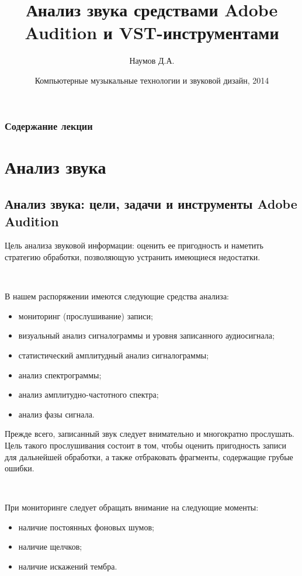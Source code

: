 \documentclass{beamer}
\title[Анализ звука]{Анализ звука средствами Adobe Audition и VST-инструментами}
\author{Наумов Д.А.}
\date[05.03.2014] {Компьютерные музыкальные технологии и звуковой дизайн, 2014}
\begin{document}
\begin{frame}
  \titlepage
\end{frame}
  
\begin{frame}
  \frametitle{Содержание лекции}
  \tableofcontents  
\end{frame}
  
\section{Анализ звука}
\subsection[Анализ звука в Audition]{Анализ звука: цели, задачи и инструменты Adobe Audition}
\begin{frame}
Цель анализа звуковой информации: оценить ее пригодность и наметить стратегию обработки, позволяющую устранить имеющиеся недостатки.

~

В нашем распоряжении имеются следующие средства анализа:
\begin{itemize}
\item мониторинг (прослушивание) записи;
\item визуальный анализ сигналограммы и уровня записанного аудиосигнала;
\item статистический амплитудный анализ сигналограммы;
\item анализ спектрограммы;
\item анализ амплитудно-частотного спектра;
\item анализ фазы сигнала.
\end{itemize}
\end{frame}   

\begin{frame}
Прежде всего, записанный звук следует внимательно и многократно прослушать. Цель такого прослушивания состоит в том, чтобы оценить пригодность записи для дальнейшей обработки, а также отбраковать фрагменты, содержащие грубые ошибки.

~

При мониторинге следует обращать внимание на следующие моменты:
\begin{itemize}
\item наличие постоянных фоновых шумов;
\item наличие щелчков;
\item наличие искажений тембра. 
\end{itemize}
\end{frame}   
\end{document}
